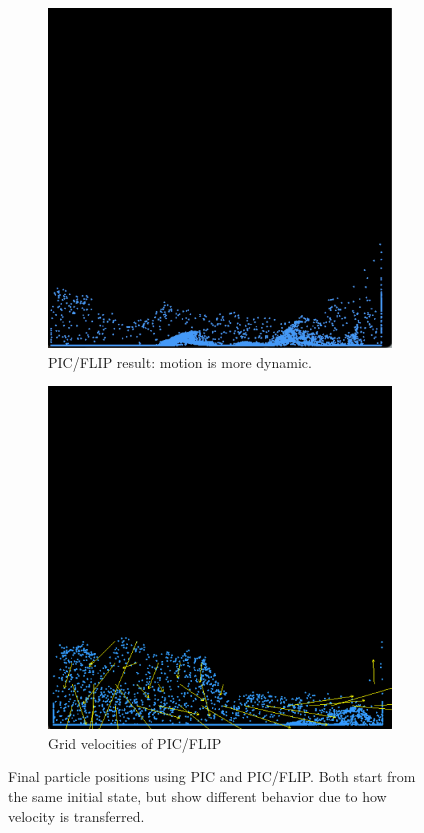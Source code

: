 \begin{figure}[h]
\begin{subfigure}[t]{0.2\textwidth}
        \includegraphics[width=\textwidth]{figures/pic_flip_result.png}
        \caption{PIC/FLIP result: motion is more dynamic.}
    \end{subfigure}
    \hspace{1em}
    \begin{subfigure}[t]{0.2\textwidth}
        \includegraphics[width=\textwidth]{figures/pic_flip_interm.png}
        \caption{Grid velocities of PIC/FLIP}
    \end{subfigure}
    \caption{Final particle positions using PIC and PIC/FLIP. Both start from the same initial state, but show different behavior due to how velocity is transferred.}
    \label{fig:pic_comparison}
\end{figure}

